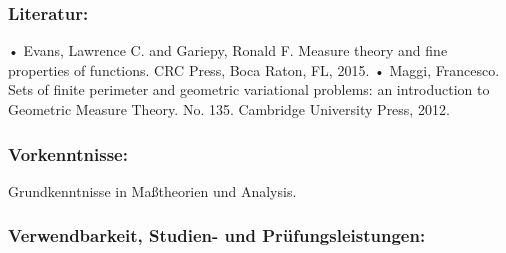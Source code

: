 \documentclass[a4paper,10pt]{article}
\begin{document}
\subsubsection*{\large
    Literatur:
}
• Evans, Lawrence C. and Gariepy, Ronald F. Measure theory and fine properties of functions.
CRC Press, Boca Raton, FL, 2015.
• Maggi, Francesco. Sets of finite perimeter and geometric variational problems: an introduction
to Geometric Measure Theory. No. 135. Cambridge University Press, 2012.
\subsubsection*{\large
    Vorkenntnisse:
}
Grundkenntnisse in Maßtheorien und Analysis.
\cleardoublepage
\subsubsection*{\large
    Verwendbarkeit, Studien- und Prüfungsleistungen:
}
\end{document}

